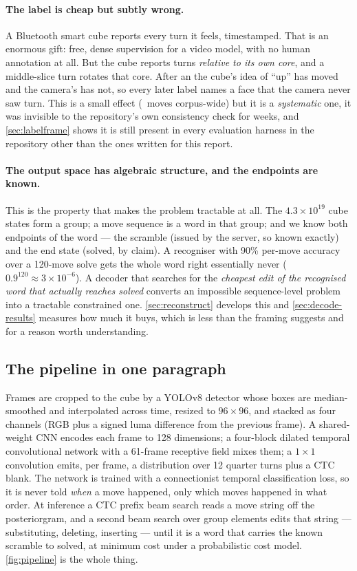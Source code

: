 \paragraph{The label is cheap but subtly wrong.}
A Bluetooth smart cube reports every turn it feels, timestamped. That is an
enormous gift: free, dense supervision for a video model, with no human
annotation at all. But the cube reports turns \emph{relative to its own
core}, and a middle-slice turn rotates that core. After an  the
cube's idea of ``up'' has moved and the camera's has not, so every later
label names a face that the camera never saw turn. This is a small effect
(\SliceMoves\ moves corpus-wide) but it is a \emph{systematic} one, it was
invisible to the repository's own consistency check for weeks, and
\cref{sec:labelframe} shows it is still present in every evaluation harness
in the repository other than the ones written for this report.

\paragraph{The output space has algebraic structure, and the endpoints are
known.} This is the property that makes the problem tractable at all. The
$4.3\times 10^{19}$ cube states form a group; a move sequence is a word in
that group; and we know both endpoints of the word --- the scramble (issued
by the server, so known exactly) and the end state (solved, by claim). A
recogniser with 90\% per-move accuracy over a 120-move solve gets the whole
word right essentially never ($0.9^{120} \approx 3\times10^{-6}$). A decoder
that searches for the \emph{cheapest edit of the recognised word that
actually reaches solved} converts an impossible sequence-level problem into
a tractable constrained one. \cref{sec:reconstruct} develops this and
\cref{sec:decode-results} measures how much it buys, which is less than the
framing suggests and for a reason worth understanding.

\subsection{The pipeline in one paragraph}

Frames are cropped to the cube by a YOLOv8 detector whose boxes are
median-smoothed and interpolated across time, resized to $96\times96$, and
stacked as four channels (RGB plus a signed luma difference from the
previous frame). A shared-weight CNN encodes each frame to 128 dimensions; a
four-block dilated temporal convolutional network with a 61-frame receptive
field mixes them; a $1\times1$ convolution emits, per frame, a distribution
over 12 quarter turns plus a CTC blank. The network is trained with a
connectionist temporal classification loss, so it is never told \emph{when} a
move happened, only which moves happened in what order. At inference a CTC
prefix beam search reads a move string off the posteriorgram, and a second
beam search over group elements edits that string --- substituting,
deleting, inserting --- until it is a word that carries the known scramble to
solved, at minimum cost under a probabilistic cost model.
\cref{fig:pipeline} is the whole thing.


